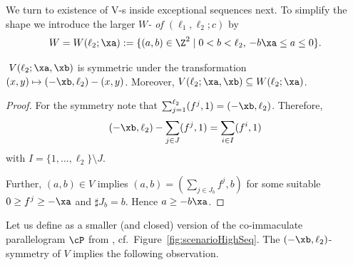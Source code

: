 We turn to existence of V-{\wbox}s inside exceptional 
sequences next. To simplify the shape we introduce the
larger \emph{$W$-{\wbox} 
of $(\ell_1,\ell_2;c)$} by 
$$
W=W(\ell_2;\xa):=\{(a,b)\in\Z^2\mid0<b<\ell_2,\,-b\xa\leq a\leq0\}.
$$

\begin{lemma}
\label{lem:comparisonVW}
$\;V(\ell_2;\xa,\xb)$ is symmetric under the transformation
$(x,y)\mapsto (-\xb,\ell_2)-(x,y)$. Moreover, $V(\ell_2;\xa,\xb)
\subseteq W(\ell_2;\xa)$. 
\end{lemma}

\begin{proof}
For the symmetry note that
$\sum_{j=1}^{\ell_2}(f^j,1)=(-\xb,\ell_2)$. {Therefore,}
$$
(-\xb,\ell_2)-\sum_{j\in J}(f^j,1)=\sum_{i\in I}(f^i,1)
$$ 
with $I=\{1,\ldots,\ell_2\}\setminus J$.

Further, $(a,b)\in V$ implies 
$(a,b)=(\sum_{j\in J_b}f^j,b)$
for some suitable $0\geq f^j\geq-\xa$ and 
$\sharp J_b=b$. Hence $a\geq-b\xa$. 
\end{proof}

Let us define
\!\!as a smaller (and closed) version 
of the {co-immaculate} parallelogram
$\cP$ from , 
cf.~Figure~\ref{fig:scenarioHighSeq}.
The $(-\xb,\ell_2)$-symmetry of $V$
implies the following observation.

